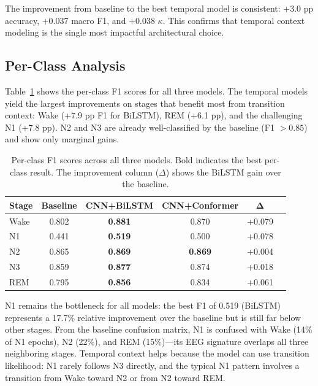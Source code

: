 \documentclass[final]{article}
\begin{document}
The improvement from baseline to the best temporal model is consistent: +3.0 pp accuracy, +0.037 macro F1, and +0.038 $\kappa$. This confirms that temporal context modeling is the single most impactful architectural choice.

\subsection{Per-Class Analysis}

Table~\ref{tab:per_class} shows the per-class F1 scores for all three models. The temporal models yield the largest improvements on stages that benefit most from transition context: Wake (+7.9 pp F1 for BiLSTM), REM (+6.1 pp), and the challenging N1 (+7.8 pp). N2 and N3 are already well-classified by the baseline (F1 $> 0.85$) and show only marginal gains.

\begin{table}[t]
\caption{Per-class F1 scores across all three models. Bold indicates the best per-class result. The improvement column ($\Delta$) shows the BiLSTM gain over the baseline.}
\label{tab:per_class}
\centering
\small
\begin{tabular}{lccccc}
\toprule
\textbf{Stage} & \textbf{Baseline} & \textbf{CNN+BiLSTM} & \textbf{CNN+Conformer} & $\boldsymbol{\Delta}$ \\
\midrule
Wake  & 0.802 & \textbf{0.881} & 0.870 & +0.079 \\
N1    & 0.441 & \textbf{0.519} & 0.500 & +0.078 \\
N2    & 0.865 & \textbf{0.869} & \textbf{0.869} & +0.004 \\
N3    & 0.859 & \textbf{0.877} & 0.874 & +0.018 \\
REM   & 0.795 & \textbf{0.856} & 0.834 & +0.061 \\
\bottomrule
\end{tabular}
\end{table}

N1 remains the bottleneck for all models: the best F1 of 0.519 (BiLSTM) represents a 17.7\% relative improvement over the baseline but is still far below other stages. From the baseline confusion matrix, N1 is confused with Wake (14\% of N1 epochs), N2 (22\%), and REM (15\%)---its EEG signature overlaps all three neighboring stages. Temporal context helps because the model can use transition likelihood: N1 rarely follows N3 directly, and the typical N1 pattern involves a transition from Wake toward N2 or from N2 toward REM.
\end{document}
